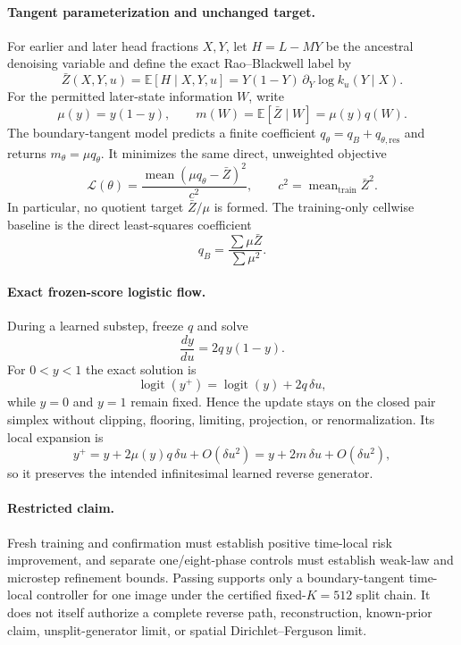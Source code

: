\documentclass[11pt]{article}
\begin{document}
\paragraph{Tangent parameterization and unchanged target.}
For earlier and later head fractions $X,Y$, let $H=L-MY$ be the ancestral
denoising variable and define the exact Rao--Blackwell label by
\[
  \bar Z(X,Y,u)=\mathbb E[H\mid X,Y,u]
  =Y(1-Y)\,\partial_Y\log k_u(Y\mid X).
\]
For the permitted later-state information $W$, write
\[
  \mu(y)=y(1-y),\qquad
  m(W)=\mathbb E[\bar Z\mid W]=\mu(y)q(W).
\]
The boundary-tangent model predicts a finite coefficient
$q_\theta=q_B+q_{\theta,\mathrm{res}}$ and returns
$m_\theta=\mu q_\theta$. It minimizes the same direct, unweighted objective
\[
  \mathcal L(\theta)
  =\frac{\operatorname{mean}(\mu q_\theta-\bar Z)^2}{c^2},
  \qquad c^2=\operatorname{mean}_{\mathrm{train}}\bar Z^2.
\]
In particular, no quotient target $\bar Z/\mu$ is formed. The training-only
cellwise baseline is the direct least-squares coefficient
\[
  q_B=\frac{\sum \mu\bar Z}{\sum \mu^2}.
\]

\paragraph{Exact frozen-score logistic flow.}
During a learned substep, freeze $q$ and solve
\[
  \frac{dy}{du}=2q\,y(1-y).
\]
For $0<y<1$ the exact solution is
\[
  \operatorname{logit}(y^+)
  =\operatorname{logit}(y)+2q\,\delta u,
\]
while $y=0$ and $y=1$ remain fixed. Hence the update stays on the closed
pair simplex without clipping, flooring, limiting, projection, or
renormalization. Its local expansion is
\[
  y^+=y+2\mu(y)q\,\delta u+O(\delta u^2)
     =y+2m\,\delta u+O(\delta u^2),
\]
so it preserves the intended infinitesimal learned reverse generator.

\paragraph{Restricted claim.}
Fresh training and confirmation must establish positive time-local risk
improvement, and separate one/eight-phase controls must establish weak-law and
microstep refinement bounds. Passing supports only a boundary-tangent
time-local controller for one image under the certified fixed-$K=512$ split
chain. It does not itself authorize a complete reverse path, reconstruction,
known-prior claim, unsplit-generator limit, or spatial
Dirichlet--Ferguson limit.
\end{document}
